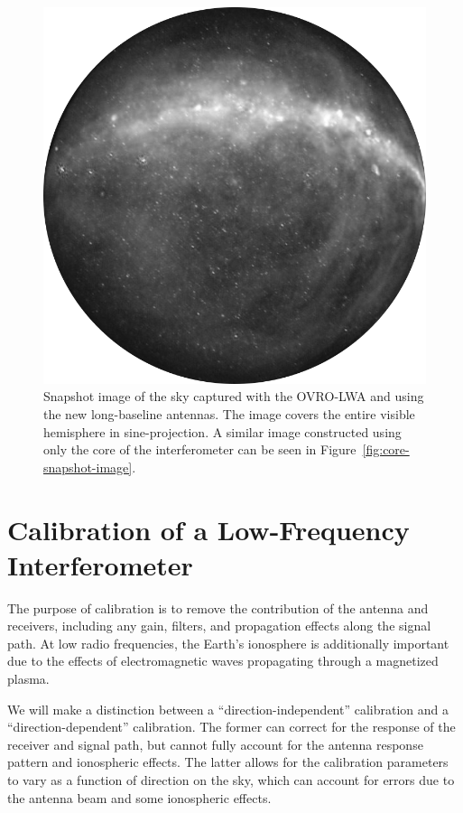 \begin{bibunit}
\begin{figure}[p]
    \centering
    \includegraphics[width=\textwidth]{figures/chapter2/after-expansion}
    \caption{
        Snapshot image of the sky captured with the OVRO-LWA and using the new long-baseline
        antennas. The image covers the entire visible hemisphere in sine-projection.  A similar
        image constructed using only the core of the interferometer can be seen in
        Figure~\ref{fig:core-snapshot-image}.
    }
    \label{fig:expansion-snapshot-image}
\end{figure}

\section{Calibration of a Low-Frequency Interferometer}\label{sec:gain-calibration}

The purpose of calibration is to remove the contribution of the antenna and receivers, including any
gain, filters, and propagation effects along the signal path. At low radio frequencies, the Earth's
ionosphere is additionally important due to the effects of electromagnetic waves propagating through
a magnetized plasma.

We will make a distinction between a ``direction-independent'' calibration and a
``direction-dependent'' calibration. The former can correct for the response of the receiver and
signal path, but cannot fully account for the antenna response pattern and ionospheric effects. The
latter allows for the calibration parameters to vary as a function of direction on the sky, which
can account for errors due to the antenna beam and some ionospheric effects.


\end{bibunit}
